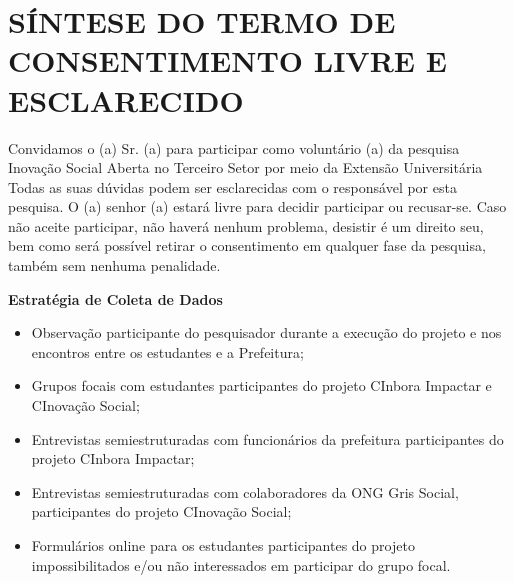 \chapter{SÍNTESE DO TERMO DE CONSENTIMENTO LIVRE E ESCLARECIDO}

Convidamos o (a) Sr. (a) para participar como voluntário (a) da pesquisa Inovação Social Aberta no Terceiro Setor por meio da Extensão Universitária Todas as suas dúvidas podem ser esclarecidas com o responsável por esta pesquisa. O (a) senhor (a) estará livre para decidir participar ou recusar-se. Caso não aceite participar, não haverá nenhum problema, desistir é um direito seu, bem como será possível retirar o consentimento em qualquer fase da pesquisa, também sem nenhuma penalidade.

\textbf{Estratégia de Coleta de Dados}
\begin{itemize}
    \item Observação participante do pesquisador durante a execução do projeto e nos encontros entre os estudantes e a Prefeitura;
    \item Grupos focais com estudantes participantes do projeto CInbora Impactar e CInovação Social;
    \item Entrevistas semiestruturadas com funcionários da prefeitura participantes do projeto CInbora Impactar;
    \item Entrevistas semiestruturadas com colaboradores da \gls{ONG} Gris Social, participantes do projeto CInovação Social;
    \item Formulários online para os estudantes participantes do projeto impossibilitados e/ou não interessados em participar do grupo focal.
\end{itemize}

